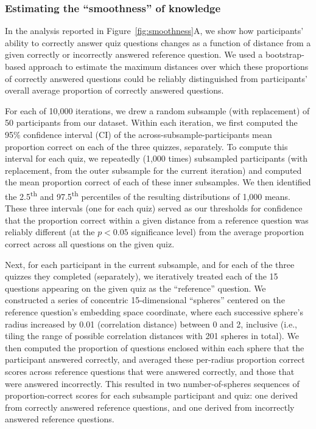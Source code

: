 \documentclass[10pt]{article}
\begin{document}
\subsubsection*{Estimating the ``smoothness'' of knowledge}\label{subsec:smoothness}

In the analysis reported in Figure~\ref{fig:smoothness}A, we show how
participants' ability to correctly answer quiz questions changes as a function
of distance from a given correctly or incorrectly answered reference question.
We used a bootstrap-based approach to estimate the maximum distances over which
these proportions of correctly answered questions could be reliably
distinguished from participants' overall average proportion of correctly
answered questions.

For each of 10,000 iterations, we drew a random subsample (with replacement) of
50 participants from our dataset. Within each iteration, we first computed the
95\% confidence interval (CI) of the across-subsample-participants mean
proportion correct on each of the three quizzes, separately. To compute this
interval for each quiz, we repeatedly (1,000 times) subsampled participants
(with replacement, from the outer subsample for the current iteration) and
computed the mean proportion correct of each of these inner subsamples. We then
identified the 2.5\textsuperscript{th} and 97.5\textsuperscript{th} percentiles
of the resulting distributions of 1,000 means. These three intervals (one for
each quiz) served as our thresholds for confidence that the proportion correct
within a given distance from a reference question was reliably different (at
the $p < 0.05$ significance level) from the average proportion correct across
all questions on the given quiz.

Next, for each participant in the current subsample, and for each of the three
quizzes they completed (separately), we iteratively treated each of the 15
questions appearing on the given quiz as the ``reference'' question. We
constructed a series of concentric 15-dimensional ``spheres'' centered on the
reference question's embedding space coordinate, where each successive sphere's
radius increased by 0.01 (correlation distance) between 0 and 2, inclusive
(i.e., tiling the range of possible correlation distances with 201 spheres in
total). We then computed the proportion of questions enclosed within each
sphere that the participant answered correctly, and averaged these per-radius
proportion correct scores across reference questions that were answered
correctly, and those that were answered incorrectly. This resulted in two
number-of-spheres sequences of proportion-correct scores for each subsample
participant and quiz: one derived from correctly answered reference questions,
and one derived from incorrectly answered reference questions.
\end{document}

